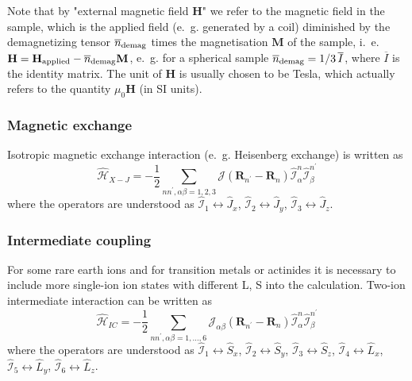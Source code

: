 \documentclass[twoside]{article}
\newcommand{\text}[1]{{\rm #1}}
\begin{document}
{Note that by "external magnetic field $\mathbf{H}$" we refer to the
magnetic field in the sample, which is the applied field (e.~g. generated by a
coil) diminished by the demagnetizing tensor $\overline{n}_{\text{demag}}$
times the magnetisation $\mathbf{M}$ of the sample, i.~e.
$\mathbf{H} = \mathbf{H}_{\text{applied}} - \overline{n}_{\text{demag}} \mathbf{M}$,
e.~g. for a spherical sample $\overline{n}_{\text{demag}} = 1/3\,\overline{I}$,
where $\overline{I}$ is the identity matrix. The unit of $\mathbf{H}$
is usually chosen to be Tesla, which actually refers to the quantity
$\mu_0 \mathbf{H}$ (in SI units).

\subsubsection{Magnetic exchange}

Isotropic magnetic exchange interaction (e.~g. Heisenberg exchange) is written as
\begin{equation}
    \hat{\mathcal{H}}_{X-J}
    =
    -
    \frac{1}{2}
    \sum_{nn^{\prime}, \alpha\beta=1,2,3}
    \mathcal{J}(\mathbf{R}_{n^{\prime}} - \mathbf{R}_{n})
    \hat{\mathcal{I}}_{\alpha}^n
    \hat{\mathcal{I}}_{\beta}^{n^{\prime}}
\end{equation}
where the operators are understood as
$\hat{\mathcal{I}}_{1}  \leftrightarrow \hat{J}_x$,
$\hat{\mathcal{I}}_{2}  \leftrightarrow \hat{J}_y$,
$\hat{\mathcal{I}}_{3}  \leftrightarrow \hat{J}_z$.

\subsubsection{Intermediate coupling}

For some rare earth ions and for transition metals or actinides it is necessary
to include more single-ion ion states with different L, S into the calculation.
Two-ion intermediate interaction can be written as 
\begin{equation}
    \hat{\mathcal{H}}_{IC}
    =
    -
    \frac{1}{2}
    \sum_{nn^{\prime},\alpha\beta=1,\dots,6}
    \mathcal{J}_{\alpha\beta}(\mathbf{R}_{n^{\prime}} - \mathbf{R}_{n})
    \hat{\mathcal{I}}_{\alpha}^n
    \hat{\mathcal{I}}_{\beta}^{n^{\prime}}
\end{equation}
where the operators are understood as
$\hat{\mathcal{I}}_{1}  \leftrightarrow \hat{S}_x$,
$\hat{\mathcal{I}}_{2}  \leftrightarrow \hat{S}_y$,
$\hat{\mathcal{I}}_{3}  \leftrightarrow \hat{S}_z$,
$\hat{\mathcal{I}}_{4}  \leftrightarrow \hat{L}_x$,
$\hat{\mathcal{I}}_{5}  \leftrightarrow \hat{L}_y$,
$\hat{\mathcal{I}}_{6}  \leftrightarrow \hat{L}_z$.

}
\end{document}
